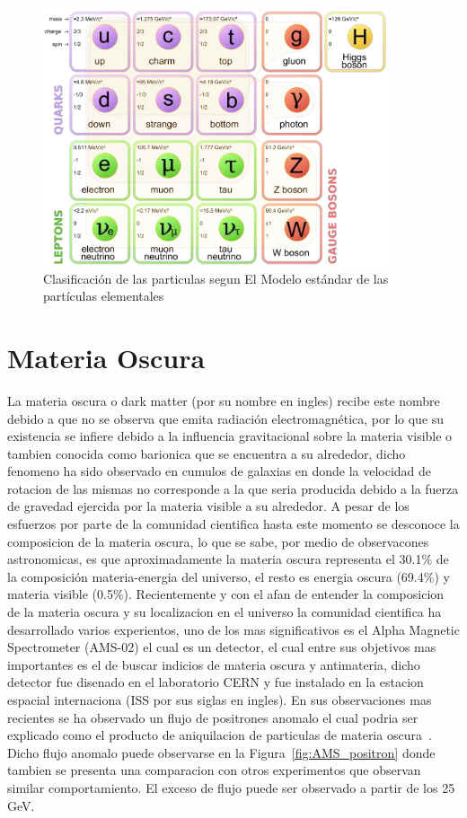 \begin{figure}
\begin{center}
  \includegraphics[width=4.0in]{standard-model.png}
  \caption{Clasificaci\'on de las particulas segun El Modelo est\'andar de las part\'iculas elementales}
  \label{fig:ME}
\end{center}
\end{figure}


\section{Materia Oscura}

La materia oscura o dark matter (por su nombre en ingles) recibe este nombre debido a que no se observa que emita radiaci\'on electromagn\'etica, por lo que su existencia se infiere debido a la influencia gravitacional sobre la materia visible o tambien conocida como barionica que se encuentra a su alrededor, dicho fenomeno ha sido observado en cumulos de galaxias en donde la velocidad de rotacion de las mismas no corresponde a la que seria producida debido a la fuerza de gravedad ejercida por la materia visible a su alrededor. A pesar de los esfuerzos por parte de la comunidad cientifica hasta este momento se desconoce la composicion de la materia oscura, lo que se sabe, por medio de observacones astronomicas, es que aproximadamente la materia oscura representa el 30.1\%  de la composici\'on materia-energia del universo, el resto es energia oscura (69.4\%) y materia visible (0.5\%). Recientemente y con el afan de entender la composicion de la materia oscura y su localizacion en el universo la comunidad cientifica ha desarrollado varios experientos, uno de los mas significativos es el Alpha Magnetic Spectrometer (AMS-02) el cual es un detector, el cual entre sus objetivos mas importantes es el de buscar indicios de materia oscura y antimateria, dicho detector fue disenado en el laboratorio CERN y fue instalado en la estacion espacial internaciona (ISS por sus siglas en ingles). En sus observaciones mas recientes se ha observado un flujo de positrones anomalo el cual podria ser explicado como el producto de aniquilacion de particulas de materia oscura~\cite{ams:cern}.  Dicho flujo anomalo puede observarse en la Figura~\ref{fig:AMS_positron} donde tambien se presenta una comparacion con otros experimentos que observan similar comportamiento.  El exceso de flujo puede ser observado a partir de los 25 GeV. 


